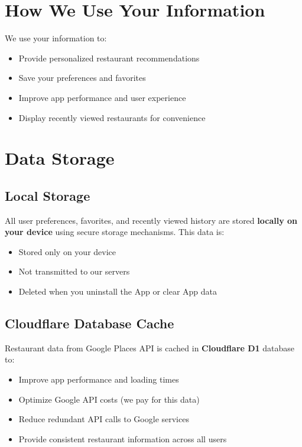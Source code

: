 \documentclass[11pt,letterpaper]{article}
\begin{document}
\section{How We Use Your Information}

We use your information to:
\begin{itemize}
    \item Provide personalized restaurant recommendations
    \item Save your preferences and favorites
    \item Improve app performance and user experience
    \item Display recently viewed restaurants for convenience
\end{itemize}

\section{Data Storage}

\subsection{Local Storage}
All user preferences, favorites, and recently viewed history are stored \textbf{locally on your device} using secure storage mechanisms. This data is:
\begin{itemize}
    \item Stored only on your device
    \item Not transmitted to our servers
    \item Deleted when you uninstall the App or clear App data
\end{itemize}

\subsection{Cloudflare Database Cache}
Restaurant data from Google Places API is cached in \textbf{Cloudflare D1} database to:
\begin{itemize}
    \item Improve app performance and loading times
    \item Optimize Google API costs (we pay for this data)
    \item Reduce redundant API calls to Google services
    \item Provide consistent restaurant information across all users
\end{itemize}
\end{document}
